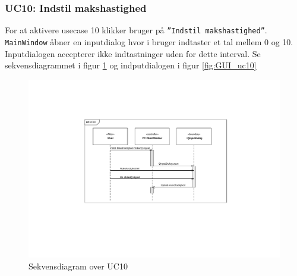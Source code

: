 \subsubsection{UC10: Indstil makshastighed}
For at aktivere usecase 10 klikker bruger på \texttt{''Indstil makshastighed''}.
\texttt{MainWindow} åbner en inputdialog hvor i bruger indtaster et tal mellem 0 og 10. Inputdialogen accepterer ikke indtastninger uden for dette interval. Se sekvensdiagrammet i figur \ref{fig:cd_uc10} og indputdialogen i figur \ref{fig:GUI_uc10}

\begin{figure}[H]
\centering
\includegraphics[width=\textwidth* 2/3,height=\textwidth* 4/10 ]{../fig/diagrammer/pc/sd_uc10.pdf}
\caption{Sekvensdiagram over UC10}
\label{fig:cd_uc10}
\end{figure}

